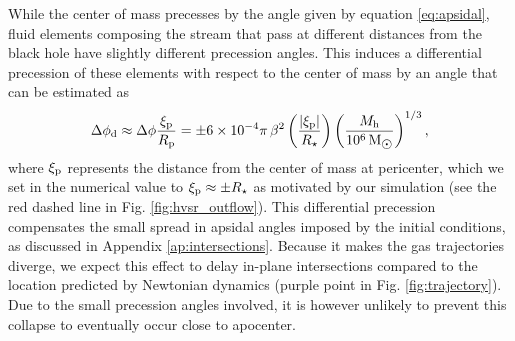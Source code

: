 \documentclass[a4paper,fleqn,usenatbib]{mnras}
\newcommand{\be}{\begin{equation}}
\newcommand{\ee}{\end{equation}}
\newcommand{\rstar}{R_{\star}}
\newcommand{\rp}{R_{\rm p}}
\newcommand{\mh}{M_{\rm h}}
\def\msun{\, \mathrm{M}_{\hbox{$\odot$}}}
\begin{document}
While the center of mass precesses by the angle given by equation \eqref{eq:apsidal}, fluid elements composing the stream that pass at different distances from the black hole have slightly different precession angles. This induces a differential precession of these elements with respect to the center of mass by an angle that can be estimated as
\be
\Delta \phi_{\rm d} \approx  \Delta \phi \frac{\xi_{\rm p}}{\rp} = \pm 6 \times 10^{-4}  \pi \, \beta^2  \left( \frac{|\xi_{\rm p}|}{\rstar} \right) \left( \frac{\mh}{10^6 \msun} \right)^{1/3},
\label{eq:apsidal_diff}
\ee
where $\xi_{\rm p}$ represents the distance from the center of mass at pericenter, which we set in the numerical value to $\xi_{\rm p} \approx \pm \rstar$ as motivated by our simulation (see the red dashed line in Fig. \ref{fig:hvsr_outflow}). This differential precession
compensates the small spread in apsidal angles imposed by the initial conditions, as discussed in Appendix \ref{ap:intersections}. Because it makes the gas trajectories diverge, we expect this effect to delay in-plane intersections compared to the location predicted by Newtonian dynamics (purple point in Fig. \ref{fig:trajectory}). Due to the small precession angles involved, it is however unlikely to prevent this collapse to eventually occur close to apocenter.
\end{document}
